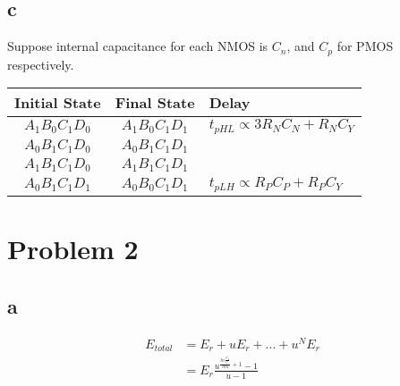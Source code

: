 \documentclass[a4paper,10pt]{article}
\begin{document}
\subsection*{c}
Suppose internal capacitance for each NMOS is \begin{math}C_n\end{math}, and \begin{math}C_p\end{math} for PMOS respectively.\\
\begin{tabular}{|c|c|l|}
 \hline
 Initial State&Final State&Delay\\ \hline
 \begin{math}A_1 B_0 C_1 D_0\end{math} & \begin{math}A_1 B_0 C_1 D_1\end{math} & \begin{math}t_{pHL}\propto 3R_N C_N + R_N C_Y\end{math}\\ \cline{1-2}
 \begin{math}A_0 B_1 C_1 D_0\end{math} & \begin{math}A_0 B_1 C_1 D_1\end{math} &\\ \cline{1-2}
 \begin{math}A_1 B_1 C_1 D_0\end{math} & \begin{math}A_1 B_1 C_1 D_1\end{math} &\\ \hline
 \begin{math}A_0 B_1 C_1 D_1\end{math} & \begin{math}A_0 B_0 C_1 D_1\end{math} & \begin{math}t_{pLH}\propto R_P C_P + R_P C_Y\end{math}\\ \hline
\end{tabular}
\section*{Problem 2}
\subsection*{a}
\begin{equation}
\begin{split}
 E_{total} &= E_r + uE_r + ... + u^N E_r\\
 &= E_r \frac{u^{\frac{ln\frac{C_L}{C_1}}{ln u} + 1} - 1}{u-1}
\end{split}
\end{equation}
\end{document}
